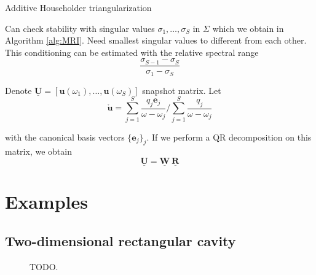 \documentclass[11pt, a4paper]{article}
\begin{document}


\citep{householder}

\begin{algorithm}
    \caption{Additive Householder triangularization} \label{alg:householder}
    
\end{algorithm}

Can check stability with singular values $\sigma_1, \dots, \sigma_S$ in 
$\Sigma$ which we obtain in Algorithm \ref{alg:MRI}. Need smallest singular values
to different from each other. This conditioning can be estimated with the relative
spectral range \cite{davidePHD}
\begin{equation}
    \frac{\sigma_{S-1} - \sigma_S}{\sigma_1 - \sigma_S}
\end{equation}

Denote $\mathbf{\underline{U}} = [\mathbf{u}(\omega_1), \dots, \mathbf{u}(\omega_S)]$
snapshot matrix.
Let 
\begin{equation}
    \mathbf{\mathring{u}} = \sum_{j=1}^S \frac{q_j \mathbf{e}_j}{\omega - \omega_j}
    / \sum_{j=1}^S \frac{q_j}{\omega - \omega_j}
\end{equation}


with the canonical basis vectors $\{ \mathbf{e}_j \}_j$.
If we perform a QR decomposition on this matrix, we obtain 
\begin{equation}
    \mathbf{\underline{U}} = \mathbf{\underline{W}} ~ \mathbf{\underline{R}}
\end{equation}


\pagebreak
\section{Examples}
\label{sec:examples}

\subsection{Two-dimensional rectangular cavity}
\label{subsec:examples-rectangularcavity}

\begin{figure}[h]
    \centering
    
    \caption{TODO.}
    \label{fig:rectangular_cavity}
\end{figure}
\end{document}
